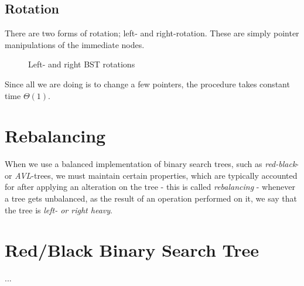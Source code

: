 \subsection{Rotation}
There are two forms of rotation; left- and right-rotation. These are simply
pointer manipulations of the immediate nodes.
\begin{figure}[H]
	\center
	\caption{Left- and right BST rotations}
	\label{fig:bst-rotations}
\end{figure}
Since all we are doing is to change a few pointers, the procedure takes
constant time $\Theta(1)$.

\section{Rebalancing}
When we use a balanced implementation of binary search trees, such as
\textit{red-black}- or \textit{AVL}-trees, we must maintain certain
properties, which are typically accounted for after applying an alteration on
the tree - this is called \textit{rebalancing} - whenever a tree gets
unbalanced, as the result of an operation performed on it, we say that the
tree is \textit{left- or right heavy}.


\newpage
\section{Red/Black Binary Search Tree}
...
